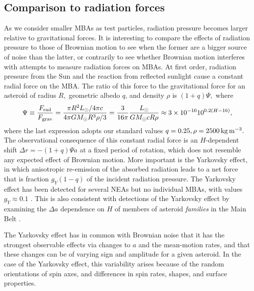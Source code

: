 \documentclass[linenumbers, onecolumn]{aastex631}
\newcommand{\eg}{\textit{e.g.\/}}
\begin{document}
\subsection{Comparison to radiation forces}
As we consider smaller MBAs as test particles, radiation pressure becomes larger relative to gravitational forces.  It is interesting to compare the effects of radiation pressure to those of Brownian motion to see when the former are a bigger source of noise than the latter, or contrarily to see whether Brownian motion interferes with attempts to measure radiation forces on MBAs.  At first order, radiation pressure from the Sun and the reaction from reflected sunlight cause a constant radial force on the MBA.  The ratio of this force to the gravitational force for an asteroid of radius $R,$ geometric albedo $q$, and density $\rho$ is $(1+q)\Psi,$ where
\begin{equation}
 \Psi \equiv \frac{F_{\rm rad}}{F_{\rm grav}} = \frac{\pi R^2 L_\odot/4\pi c}{4\pi GM_\odot R^3\rho/3}
   = \frac{3}{16\pi} \frac{L_\odot}{GM_\odot c R \rho} \approx 3\times10^{-10} 10^{0.2(H-16)},
\end{equation}
where the last expression adopts our standard values $q=0.25, \rho=2500\,{\rm kg}\, {\rm m}^{-3}.$ The observational consequence of this constant radial force is an $H$-dependent shift $\Delta r = -(1+q)\Psi a$ at a fixed period of rotation, which does not resemble any expected effect of Brownian motion.  More important is the Yarkovsky effect, in which anisotropic re-emission of the absorbed radiation leads to a net force that is fraction $g_Y(1-q)$ of the incident radiation pressure.  The Yarkovsky effect has been detected for several NEAs but no individual MBAs, with values $g_Y \approx 0.1$ \citep[Yarkovsky effect and data are review by][]{yarkovsky}.  This is also consistent with detections of the Yarkovsky effect by examining the $\Delta a$ dependence on $H$ of members of asteroid \emph{families} in the Main Belt \citep[\eg][]{karin}.

 The Yarkovsky effect has in common with Brownian noise that it has the strongest observable effects via changes to $a$ and the mean-motion rates, and that these changes can be of varying sign and amplitude for a given asteroid.  In the case of the Yarkovsky effect, this variability arises because of the random orientations of spin axes, and differences in spin rates, shapes, and surface properties.  
 
\end{document}

